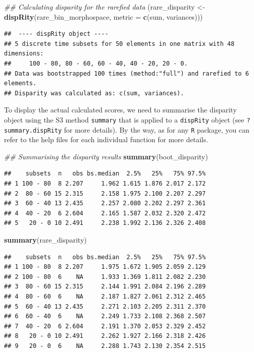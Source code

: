 \documentclass[]{book}
\newenvironment{Shaded}{\begin{snugshade}}{\end{snugshade}}
\newcommand{\CommentTok}[1]{\textcolor[rgb]{0.56,0.35,0.01}{\textit{#1}}}
\newcommand{\DataTypeTok}[1]{\textcolor[rgb]{0.13,0.29,0.53}{#1}}
\newcommand{\KeywordTok}[1]{\textcolor[rgb]{0.13,0.29,0.53}{\textbf{#1}}}
\newcommand{\NormalTok}[1]{#1}
\newcommand{\StringTok}[1]{\textcolor[rgb]{0.31,0.60,0.02}{#1}}
\begin{document}
\begin{Shaded}
\begin{Highlighting}[]
\CommentTok{## Calculating disparity for the rarefied data}
\NormalTok{(rare_disparity <-}\StringTok{ }\KeywordTok{dispRity}\NormalTok{(rare_bin_morphospace, }\DataTypeTok{metric =} \KeywordTok{c}\NormalTok{(sum, variances)))}
\end{Highlighting}
\end{Shaded}

\begin{verbatim}
##  ---- dispRity object ---- 
## 5 discrete time subsets for 50 elements in one matrix with 48 dimensions:
##     100 - 80, 80 - 60, 60 - 40, 40 - 20, 20 - 0.
## Data was bootstrapped 100 times (method:"full") and rarefied to 6 elements.
## Disparity was calculated as: c(sum, variances).
\end{verbatim}

To display the actual calculated scores, we need to summarise the disparity object using the S3 method \texttt{summary} that is applied to a \texttt{dispRity} object (see \texttt{?summary.dispRity} for more details).
By the way, as for any \texttt{R} package, you can refer to the help files for each individual function for more details.

\begin{Shaded}
\begin{Highlighting}[]
\CommentTok{## Summarising the disparity results}
\KeywordTok{summary}\NormalTok{(boot_disparity)}
\end{Highlighting}
\end{Shaded}

\begin{verbatim}
##    subsets  n   obs bs.median  2.5%   25%   75% 97.5%
## 1 100 - 80  8 2.207     1.962 1.615 1.876 2.017 2.172
## 2  80 - 60 15 2.315     2.158 1.975 2.100 2.207 2.297
## 3  60 - 40 13 2.435     2.257 2.080 2.202 2.297 2.361
## 4  40 - 20  6 2.604     2.165 1.587 2.032 2.320 2.472
## 5   20 - 0 10 2.491     2.238 1.992 2.136 2.326 2.408
\end{verbatim}

\begin{Shaded}
\begin{Highlighting}[]
\KeywordTok{summary}\NormalTok{(rare_disparity)}
\end{Highlighting}
\end{Shaded}

\begin{verbatim}
##    subsets  n   obs bs.median  2.5%   25%   75% 97.5%
## 1 100 - 80  8 2.207     1.975 1.672 1.905 2.059 2.129
## 2 100 - 80  6    NA     1.933 1.369 1.811 2.082 2.230
## 3  80 - 60 15 2.315     2.144 1.991 2.084 2.196 2.289
## 4  80 - 60  6    NA     2.187 1.827 2.061 2.312 2.465
## 5  60 - 40 13 2.435     2.271 2.103 2.205 2.311 2.370
## 6  60 - 40  6    NA     2.249 1.733 2.108 2.368 2.507
## 7  40 - 20  6 2.604     2.191 1.370 2.053 2.329 2.452
## 8   20 - 0 10 2.491     2.262 1.927 2.166 2.318 2.426
## 9   20 - 0  6    NA     2.288 1.743 2.130 2.354 2.515
\end{verbatim}
\end{document}
